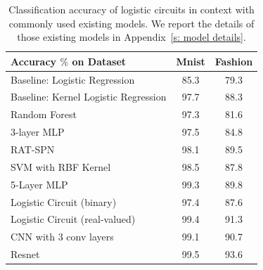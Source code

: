 \documentclass[letterpaper]{article} %
\begin{document}
\begin{table}[t]
\centering
\begin{minipage}{0.48\textwidth}
\caption{Classification accuracy of logistic circuits in context with commonly used existing models. We report the details of those existing models in Appendix~\ref{s: model details}.}
\label{table: accuracy}
\centering
{\fontsize{8.5}{9}\selectfont
\begin{sc}
\begin{tabular}{ @{}l c c @{} }
\toprule
Accuracy $\%$ on Dataset & Mnist & Fashion \\
\midrule\midrule
Baseline: Logistic Regression & 85.3 & 79.3 \\
Baseline: Kernel Logistic Regression & 97.7 & 88.3 \\
Random Forest & 97.3 & 81.6 \\
3-layer MLP\label{3MLP}
& 97.5 & 84.8\\
RAT-SPN \cite{rat-spn2018} &98.1 & 89.5\\
SVM with RBF Kernel & 98.5 & 87.8 \\
5-Layer MLP  & 99.3 & 89.8 \\
\midrule
Logistic Circuit (binary) &  97.4 & 87.6 \\
Logistic Circuit (real-valued) & 99.4 & 91.3\\
\midrule
CNN with 3 conv layers & 99.1  &90.7\\
Resnet \cite{he2016cvpr}& 99.5 & 93.6 \\
\bottomrule
\end{tabular}
\end{sc}
}
\end{minipage}
\end{table}
\end{document}
